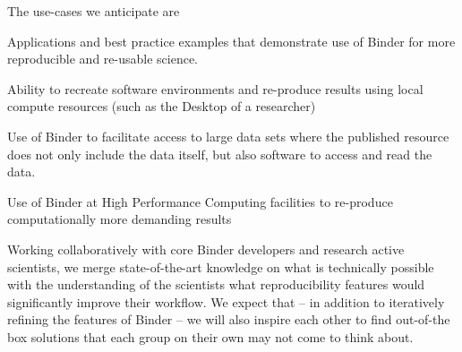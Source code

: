 \begin{workpackage}
\begin{wpdescription}
  The use-cases we anticipate are
  \begin{compactitem}
  \item {} Applications and best practice examples that
    demonstrate use of Binder for more reproducible and re-usable science.
  \item {} Ability to recreate software environments
    and re-produce results using local compute resources (such as the Desktop of
    a researcher)
  \item {} Use of Binder to facilitate access to
    large data sets where the published resource does not only include the data
    itself, but also software to access and read the data.
  \item {} Use of Binder at High Performance Computing
    facilities to re-produce computationally more demanding results
  \end{compactitem}


  Working collaboratively with core Binder developers and research active
  scientists, we merge state-of-the-art knowledge on what is technically
  possible with the understanding of the scientists what reproducibility
  features would significantly improve their workflow. We expect that -- in
  addition to iteratively refining the features of Binder -- we will also
  inspire each other to find out-of-the box solutions that each group on
  their own may not come to think about.

  \medskip



\end{wpdescription}
\end{workpackage}
